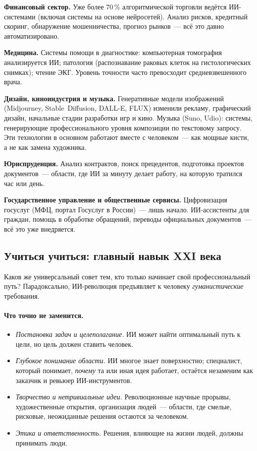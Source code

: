 \textbf{Финансовый сектор.} Уже более 70\,\% алгоритмической торговли
ведётся ИИ-системами (включая системы на основе нейросетей). Анализ
рисков, кредитный скоринг, обнаружение мошенничества, прогноз
рынков~--- всё это давно автоматизировано.

\textbf{Медицина.} Системы помощи в диагностике: компьютерная
томография анализируется ИИ; патология (распознавание раковых клеток на
гистологических снимках); чтение ЭКГ. Уровень точности часто
превосходит средневзвешенного врача.

\textbf{Дизайн, киноиндустрия и музыка.} Генеративные модели изображений
(Midjourney, Stable~Diffusion, DALL-E, FLUX) изменили рекламу,
графический дизайн, начальные стадии разработки игр и кино. Музыка
(Suno, Udio): системы, генерирующие профессионального уровня
композиции по текстовому запросу. Эти технологии в основном работают
вместе с человеком~--- как мощные кисти, а не как замена художника.

\textbf{Юриспруденция.} Анализ контрактов, поиск прецедентов,
подготовка проектов документов~--- области, где ИИ за минуту делает
работу, на которую тратился час или день.

\textbf{Государственное управление и общественные сервисы.}
Цифровизация госуслуг (МФЦ, портал Госуслуг в России)~--- лишь начало.
ИИ-ассистенты для граждан, помощь в обработке обращений, переводы
официальных документов~--- всё это уже внедряется.

\subsection{Учиться учиться: главный навык XXI века}

Каков же универсальный совет тем, кто только начинает свой
профессиональный путь? Парадоксально, ИИ-революция предъявляет к
человеку \emph{гуманистические} требования.

\paragraph{Что точно не заменится.}
\begin{itemize}\itemsep1pt
  \item \emph{Постановка задач и целеполагание.} ИИ может найти
        оптимальный путь к цели, но цель должен ставить человек.
  \item \emph{Глубокое понимание области.} ИИ многое знает поверхностно;
        специалист, который понимает, \emph{почему} та или иная идея
        работает, остаётся незаменим как заказчик и ревьюер
        ИИ-инструментов.
  \item \emph{Творчество и нетривиальные идеи.} Революционные научные
        прорывы, художественные открытия, организация людей~--- области,
        где смелые, рисковые, неожиданные решения остаются за человеком.
  \item \emph{Этика и ответственность.} Решения, влияющие на жизни
        людей, должны принимать люди.
\end{itemize}

